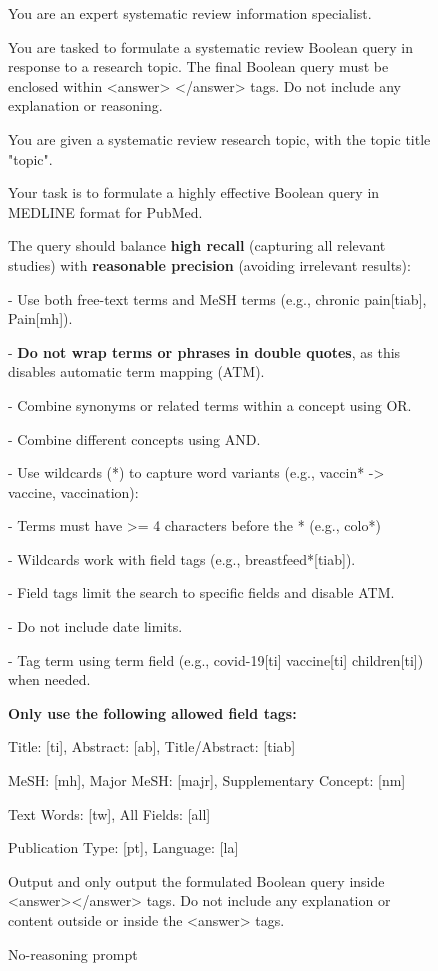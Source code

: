 \begin{figure}[ht!]
	\centering
	\small
	\begin{PromptBox}
		You are an expert systematic review information specialist.
		
		You are tasked to formulate a systematic review Boolean query in response to a research topic. The final Boolean query must be enclosed within <answer> </answer> tags. Do not include any explanation or reasoning.
	\end{PromptBox}
	
	\vspace{1em}
	
	\begin{PromptBox}
		You are given a systematic review research topic, with the topic title "{topic}".
		
		Your task is to formulate a highly effective Boolean query in MEDLINE format for PubMed.
		
		The query should balance \textbf{high recall} (capturing all relevant studies) with \textbf{reasonable precision} (avoiding irrelevant results):
		
		- Use both free-text terms and MeSH terms (e.g., chronic pain[tiab], Pain[mh]).
		
		- \textbf{Do not wrap terms or phrases in double quotes}, as this disables automatic term mapping (ATM).
		
		- Combine synonyms or related terms within a concept using OR.
		
		- Combine different concepts using AND.
		
		- Use wildcards (*) to capture word variants (e.g., vaccin* -> vaccine, vaccination):
		
		- Terms must have >= 4 characters before the * (e.g., colo*)
		
		- Wildcards work with field tags (e.g., breastfeed*[tiab]).
		
		- Field tags limit the search to specific fields and disable ATM.
		
		- Do not include date limits.
		
		- Tag term using term field (e.g., covid-19[ti] vaccine[ti] children[ti]) when needed.
		
		\textbf{Only use the following allowed field tags:}
		
		Title: [ti], Abstract: [ab], Title/Abstract: [tiab]
		
		MeSH: [mh], Major MeSH: [majr], Supplementary Concept: [nm]
		
		Text Words: [tw], All Fields: [all]
		
		Publication Type: [pt], Language: [la]
		
		
		Output and only output the formulated Boolean query inside <answer></answer> tags. Do not include any explanation or content outside or inside the <answer> tags.
	\end{PromptBox}
	
	\caption{No-reasoning prompt}
	\label{fig:no-reasoning-prompt}
\end{figure}